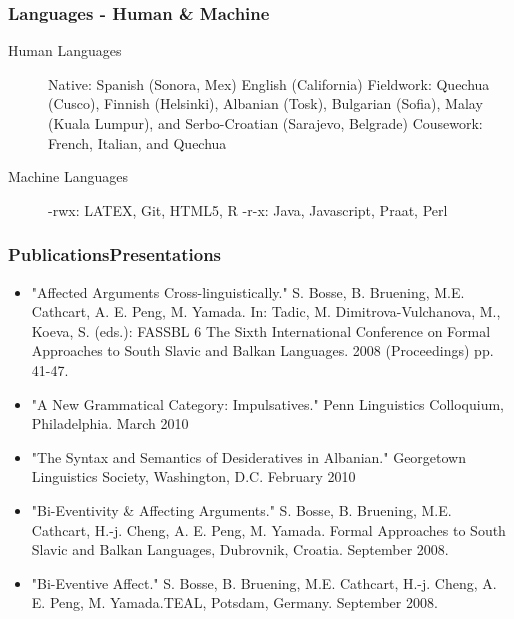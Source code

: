 \documentclass[12 pt]{article}
\begin{document}
\subsubsection{Languages - Human \& Machine}
\begin{description}
\item [
Human Languages] Native: Spanish (Sonora, Mex) English (California) Fieldwork: Quechua (Cusco), Finnish (Helsinki), Albanian (Tosk), Bulgarian (Sofia), Malay (Kuala Lumpur), and Serbo-Croatian (Sarajevo, Belgrade) Cousework: French, Italian, and Quechua
\item [
Machine Languages] -rwx: LATEX, Git, HTML5, R -r-x: Java, Javascript, Praat, Perl

\end{description}


\subsubsection{PublicationsPresentations}

\begin{itemize}
\item "Affected Arguments Cross-linguistically." S. Bosse, B. Bruening, M.E. Cathcart, A. E. Peng, M. Yamada. In: Tadic, M. Dimitrova-Vulchanova, M., Koeva, S. (eds.): FASSBL 6 The Sixth International Conference on Formal Approaches to South Slavic and Balkan Languages. 2008 (Proceedings) pp. 41-47.
\item "A New Grammatical Category: Impulsatives." Penn Linguistics Colloquium, Philadelphia. March 2010
\item"The Syntax and Semantics of Desideratives in Albanian." Georgetown Linguistics Society, Washington, D.C. February 2010
\item "Bi-Eventivity \& Affecting Arguments." S. Bosse, B. Bruening, M.E. Cathcart, H.-j. Cheng, A. E. Peng, M. Yamada. Formal Approaches to South Slavic and Balkan Languages, Dubrovnik, Croatia. September 2008.
\item "Bi-Eventive Affect." S. Bosse, B. Bruening, M.E. Cathcart, H.-j. Cheng, A. E. Peng, M. Yamada.TEAL, Potsdam, Germany. September 2008.
\end{itemize}
\end{document}
